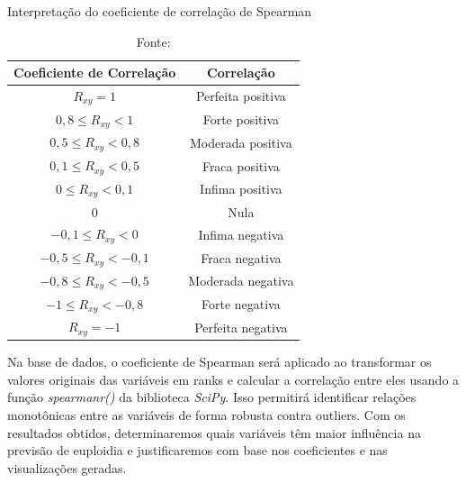 \begin{apendicesenv}
\begin{table}[h!]
  \centering
  \captionsetup{font=footnotesize, justification=centering, labelsep=period, position=above}
  \caption{ Interpretação do coeficiente de correlação de Spearman}
  \label{tab:correlacao_pearson}
  \begin{tabular}{|c|c|}
  \hline
  \vspace{0.2cm} \cellcolor[HTML]{C0C0C0} \textbf{Coeficiente de Correlação} & \cellcolor[HTML]{C0C0C0} \textbf{Correlação} \\
  \hline
  $R_{xy} = 1$ & Perfeita positiva \\
  \hline
  $0,8 \leq R_{xy} < 1$ & Forte positiva \\
  \hline
  $0,5 \leq R_{xy} < 0,8$ & Moderada positiva \\
  \hline
  $0,1 \leq R_{xy} < 0,5$ & Fraca positiva \\
  \hline
  $0 \leq R_{xy} < 0,1$ & Infima positiva \\
  \hline
  $0$ & Nula \\
  \hline
  $-0,1 \leq R_{xy} < 0$ & Infima negativa \\
  \hline
  $-0,5 \leq R_{xy} < -0,1$ & Fraca negativa \\
  \hline
  $-0,8 \leq R_{xy} < -0,5$ & Moderada negativa \\
  \hline
  $-1 \leq R_{xy} < -0,8$ & Forte negativa \\
  \hline
  $R_{xy} = -1$ & Perfeita negativa \\
  \hline
  \end{tabular}
  \caption*{\scriptsize Fonte: \cite{santos2007}}
\end{table}

Na base de dados, o coeficiente de Spearman será aplicado ao transformar os valores originais das variáveis em ranks e calcular a correlação entre eles usando a função \textit{spearmanr()} da biblioteca \textit{SciPy}. Isso permitirá identificar relações monotônicas entre as variáveis de forma robusta contra outliers. Com os resultados obtidos, determinaremos quais variáveis têm maior influência na previsão de euploidia e justificaremos com base nos coeficientes e nas visualizações geradas.

\end{apendicesenv}
